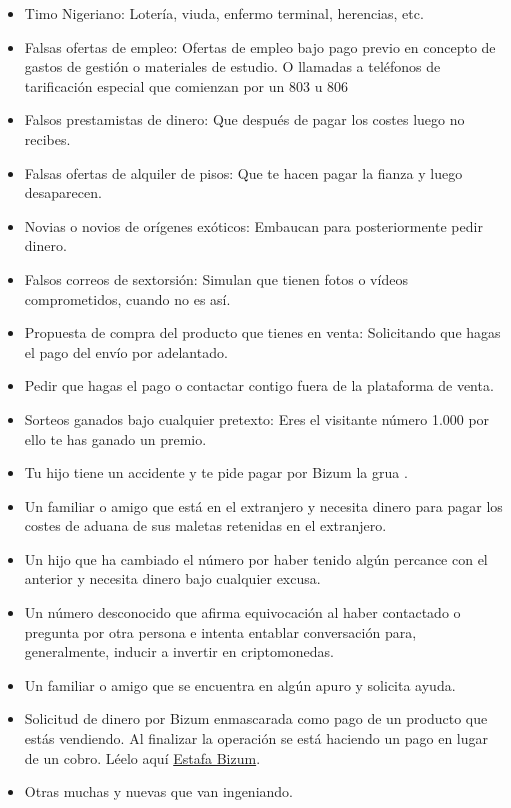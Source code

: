 \documentclass[
  a4paper,
  openany]{book}
\begin{document}
\begin{itemize}
\item
  Timo Nigeriano: Lotería, viuda, enfermo terminal, herencias, etc.
\item
  Falsas ofertas de empleo: Ofertas de empleo bajo pago previo en concepto de gastos de gestión o materiales de estudio. O llamadas a teléfonos de tarificación especial que comienzan por un 803 u 806
\item
  Falsos prestamistas de dinero: Que después de pagar los costes luego no recibes.
\item
  Falsas ofertas de alquiler de pisos: Que te hacen pagar la fianza y luego desaparecen.
\item
  Novias o novios de orígenes exóticos: Embaucan para posteriormente pedir dinero.
\item
  Falsos correos de sextorsión: Simulan que tienen fotos o vídeos comprometidos, cuando no es así.
\item
  Propuesta de compra del producto que tienes en venta: Solicitando que hagas el pago del envío por adelantado.
\item
  Pedir que hagas el pago o contactar contigo fuera de la plataforma de venta.
\item
  Sorteos ganados bajo cualquier pretexto: Eres el visitante número 1.000 por ello te has ganado un premio.
\item
  Tu hijo tiene un accidente y te pide pagar por Bizum la grua \citep{INCI-bizum}.
\item
  Un familiar o amigo que está en el extranjero y necesita dinero para pagar los costes de aduana de sus maletas retenidas en el extranjero.
\item
  Un hijo que ha cambiado el número por haber tenido algún percance con el anterior y necesita dinero bajo cualquier excusa.
\item
  Un número desconocido que afirma equivocación al haber contactado o pregunta por otra persona e intenta entablar conversación para, generalmente, inducir a invertir en criptomonedas.
\item
  Un familiar o amigo que se encuentra en algún apuro y solicita ayuda.
\item
  Solicitud de dinero por Bizum enmascarada como pago de un producto que estás vendiendo. Al finalizar la operación se está haciendo un pago en lugar de un cobro. Léelo aquí \href{https://bizum.es/blog/estafa-bizum/}{Estafa Bizum}.
\item
  Otras muchas y nuevas que van ingeniando.
\end{itemize}
\end{document}
